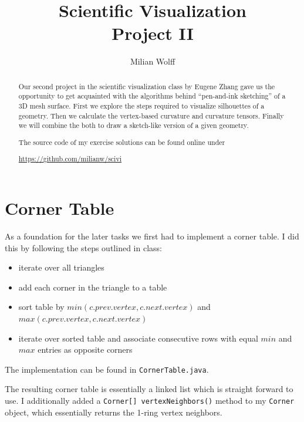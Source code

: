 \documentclass[a4paper,10pt,notitlepage]{scrreprt}
\title{Scientific Visualization\\Project II}
\author{Milian Wolff}
\begin{document}
\maketitle

\begin{abstract}
Our second project in the scientific visualization class by Eugene Zhang gave
us the opportunity to get acquainted with the algorithms behind ``pen-and-ink
sketching'' of a 3D mesh surface. First we explore the steps required to
visualize silhouettes of a geometry. Then we calculate the vertex-based
curvature and curvature tensors. Finally we will combine the both to draw a
sketch-like version of a given geometry.

The source code of my exercise solutions can be found online under

\begin{center}\url{https://github.com/milianw/scivi}\end{center}
\end{abstract}

\begingroup
\let\clearpage\relax

\tableofcontents
\endgroup

\chapter{Corner Table}

As a foundation for the later tasks we first had to implement a corner table. I
did this by following the steps outlined in class:

\begin{itemize}
 \item iterate over all triangles
 \item add each corner in the triangle to a table
 \item sort table by $min(c.prev.vertex, c.next.vertex)$ and
$max(c.prev.vertex, c.next.vertex)$
 \item iterate over sorted table and associate consecutive rows with equal
$min$ and $max$ entries as opposite corners
\end{itemize}

The implementation can be found in \texttt{CornerTable.java}.

The resulting corner table is essentially a linked list which is straight
forward to use. I additionally added a \texttt{Corner[] vertexNeighbors()}
method to my \texttt{Corner} object, which essentially returns the 1-ring
vertex neighbors.
\end{document}
